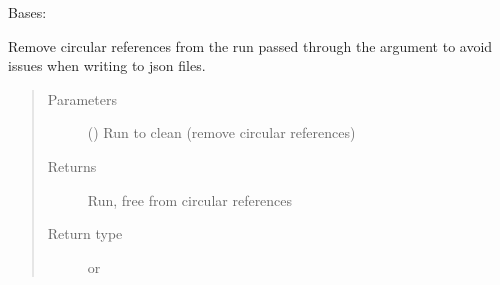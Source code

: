 \documentclass[letterpaper,10pt,english]{sphinxmanual}
\begin{document}
\begin{fulllineitems}
\label{\detokenize{polo.utils:polo.utils.io_utils.XtalWriter}}
Bases: {\hyperref[\detokenize{polo.utils:polo.utils.io_utils.RunSerializer}]{}}

\begin{fulllineitems}
\label{\detokenize{polo.utils:polo.utils.io_utils.XtalWriter.clean_run_for_save}}
Remove circular references from the run passed through the 
argument to avoid issues when writing to json files.
\begin{quote}\begin{description}
\item[{Parameters}] \leavevmode
{} ({\hyperref[\detokenize{polo.crystallography:polo.crystallography.run.Run}]{}}) \textendash{} Run to clean (remove circular references)

\item[{Returns}] \leavevmode
Run, free from circular references

\item[{Return type}] \leavevmode
{\hyperref[\detokenize{polo.crystallography:polo.crystallography.run.Run}]{}} or {\hyperref[\detokenize{polo.crystallography:polo.crystallography.run.HWIRun}]{}}

\end{description}\end{quote}

\end{fulllineitems}



\end{fulllineitems}
\end{document}
